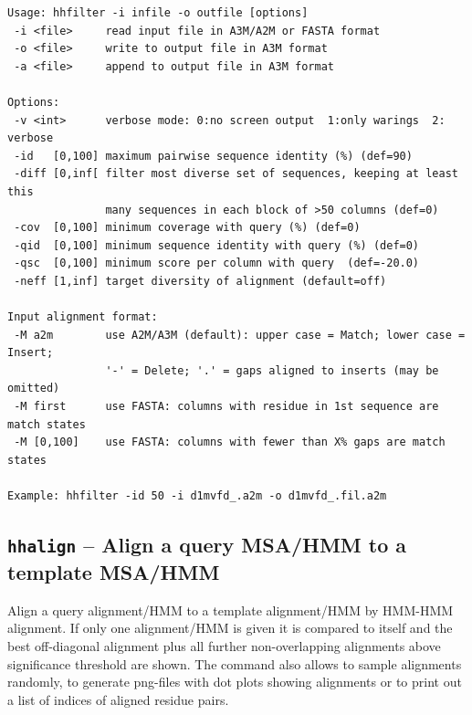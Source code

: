 \documentclass[11pt,a4paper]{article}
\begin{document}
\small 
\begin{verbatim}
Usage: hhfilter -i infile -o outfile [options]                  
 -i <file>     read input file in A3M/A2M or FASTA format                 
 -o <file>     write to output file in A3M format                         
 -a <file>     append to output file in A3M format                        

Options:                                                                  
 -v <int>      verbose mode: 0:no screen output  1:only warings  2: verbose
 -id   [0,100] maximum pairwise sequence identity (%) (def=90)   
 -diff [0,inf[ filter most diverse set of sequences, keeping at least this    
               many sequences in each block of >50 columns (def=0)
 -cov  [0,100] minimum coverage with query (%) (def=0) 
 -qid  [0,100] minimum sequence identity with query (%) (def=0) 
 -qsc  [0,100] minimum score per column with query  (def=-20.0)
 -neff [1,inf] target diversity of alignment (default=off)

Input alignment format:                                                    
 -M a2m        use A2M/A3M (default): upper case = Match; lower case = Insert;
               '-' = Delete; '.' = gaps aligned to inserts (may be omitted)   
 -M first      use FASTA: columns with residue in 1st sequence are match states
 -M [0,100]    use FASTA: columns with fewer than X% gaps are match states   
                                                                          
Example: hhfilter -id 50 -i d1mvfd_.a2m -o d1mvfd_.fil.a2m      
\end{verbatim} 
\normalsize

\subsection{{\tt hhalign} -- Align a query MSA/HMM to a template MSA/HMM}

Align a query alignment/HMM to a template alignment/HMM by HMM-HMM alignment.
If only one alignment/HMM is given it is compared to itself and the best
off-diagonal alignment plus all further non-overlapping alignments above 
significance threshold are shown. The command also allows to sample
alignments randomly, to generate png-files with dot plots showing 
alignments or to print out a list of indices of aligned residue pairs. 
\end{document}
